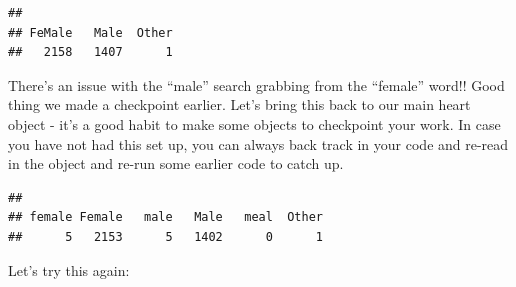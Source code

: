\documentclass[
]{book}
\newenvironment{Shaded}{\begin{snugshade}}{\end{snugshade}}
\newcommand{\CommentTok}[1]{\textcolor[rgb]{0.56,0.35,0.01}{\textit{#1}}}
\newcommand{\FunctionTok}[1]{\textcolor[rgb]{0.13,0.29,0.53}{\textbf{#1}}}
\newcommand{\NormalTok}[1]{#1}
\newcommand{\OtherTok}[1]{\textcolor[rgb]{0.56,0.35,0.01}{#1}}
\newcommand{\SpecialCharTok}[1]{\textcolor[rgb]{0.81,0.36,0.00}{\textbf{#1}}}
\newcommand{\StringTok}[1]{\textcolor[rgb]{0.31,0.60,0.02}{#1}}
\begin{document}
\begin{Shaded}
\end{Shaded}

\begin{verbatim}
## 
## FeMale   Male  Other 
##   2158   1407      1
\end{verbatim}

There's an issue with the ``male'' search grabbing from the ``female'' word!! Good thing we made a checkpoint earlier. Let's bring this back to our main heart object - it's a good habit to make some objects to checkpoint your work. In case you have not had this set up, you can always back track in your code and re-read in the object and re-run some earlier code to catch up.

\begin{Shaded}
\end{Shaded}

\begin{verbatim}
## 
## female Female   male   Male   meal  Other 
##      5   2153      5   1402      0      1
\end{verbatim}

Let's try this again:

\begin{Shaded}
\end{Shaded}
\end{document}
